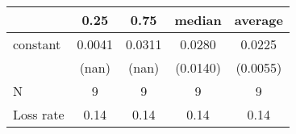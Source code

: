 \begin{tabular}{lcccc}
\hline
          &  0.25  &  0.75  &  median  & average   \\
\midrule
\midrule
constant  & 0.0041 & 0.0311 & 0.0280   & 0.0225    \\
          & (nan)  & (nan)  & (0.0140) & (0.0055)  \\
N         & 9      & 9      & 9        & 9         \\
Loss rate & 0.14   & 0.14   & 0.14     & 0.14      \\
\hline
\end{tabular}